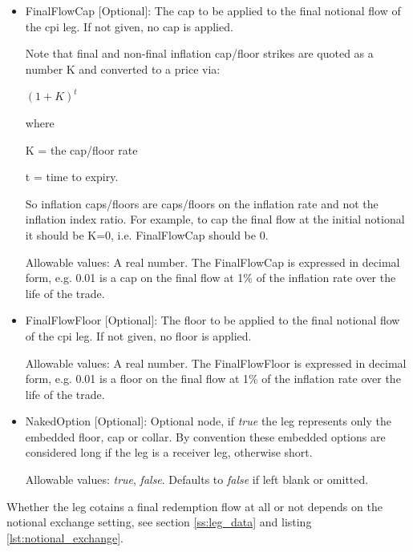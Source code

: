 \begin{itemize}
Allowable values: Each child element can take any real number. The floor is
expressed in decimal form, e.g. 0.01 is a cap of 1\%.

\item FinalFlowCap [Optional]: The cap to be applied to the final notional flow of the cpi leg. If not given, no cap
  is applied.

Note that final and non-final inflation cap/floor strikes are quoted as a number K and converted to a price via:

$
(1+K)^t
$

 where

K = the cap/floor rate

t = time to expiry.

So inflation caps/floors are caps/floors on the inflation rate and not the inflation index ratio. For example, to cap the final flow at the initial notional  it should be K=0, i.e. FinalFlowCap should be 0.


Allowable values: A real number. The FinalFlowCap is expressed in decimal form, e.g. 0.01 is a cap on the final flow at 1\% of the inflation rate over the life of the trade.


\item FinalFlowFloor [Optional]: The floor to be applied to the final notional flow of the cpi leg. If not given, no floor
  is applied.


Allowable values: A real number. The FinalFlowFloor is expressed in decimal form, e.g. 0.01 is a floor on the final flow at 1\% of the inflation rate over the life of the trade.

\item NakedOption [Optional]: Optional node, if \emph{true} the leg represents only the embedded floor, cap or collar.
By convention these embedded options are considered long if the leg is a receiver leg, otherwise short.

 Allowable values:  \emph{true}, \emph{false}. Defaults to \emph{false} if left blank or omitted.

\end{itemize}

Whether the leg cotains a final redemption flow at all or not depends on the
 notional exchange setting, see section \ref{ss:leg_data} and listing \ref{lst:notional_exchange}.

